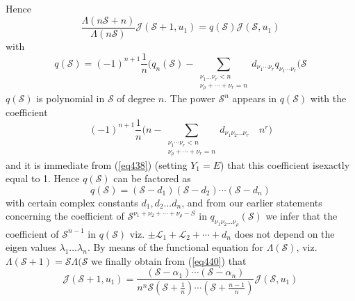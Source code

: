 Hence
\begin{equation*}
\frac{\Lambda (n\mathscr{S}+ n)}{\Lambda (n\mathscr{S})}
\mathcal{J}(\mathscr{S}+1,u_1) = q(\mathscr{S})
\mathcal{J}(\mathscr{S},u_1) \tag{440}\label{eq440} 
\end{equation*}
with 
\begin{equation*}
q(\mathscr{S}) = (-1)^{n+1} \frac{1}{n}(q_n(\mathscr{S}) -
\sum_{\substack{\nu_1 \ldots \nu_r < n \\ \nu_\rho + \cdots + \nu_r =
    n}} d_{\nu_1 \cdots \nu_r} q_{\nu_1 \cdots \nu_r} (\mathscr{S}
\tag{441}\label{eq441} 
\end{equation*}
$q(\mathscr{S})$ is polynomial in $\mathscr{S}$ of degree $n$. The
power $\mathscr{S}^n$ appears in $q(\mathscr{S})$ with the coefficient 
$$
(-1)^{n+1}\frac{1}{n}\big( n - \sum_{\substack{\nu_1 \cdots \nu_r < n
    \\ \nu_\rho + \cdots + \nu_r = n}} d_{\nu_1\nu_2 \ldots \nu_r}
\quad n^r \big) 
$$
and it is immediate from (\ref{eq438}) (setting $Y_1 = E$) that this
coefficient is\pageoriginale exactly equal to 1. Hence
$q(\mathscr{S})$ can be factored as   
\begin{equation*}
q(\mathscr{S}) = (\mathscr{S}-d_1)(\mathscr{S}-d_2) \cdots
(\mathscr{S}-d_n) \tag{442}\label{eq442} 
\end{equation*}
with certain complex constants $d_1,d_2 \ldots d_n$, and from our
earlier statements concerning the coefficient of $\mathscr{S}^{\nu_1+
  \nu_2 + \cdots + \nu_\rho - S}$ in $q_{\nu_1\nu_2 \ldots
  \nu_\rho}(\mathscr{S})$ we infer that the coefficient of
$\mathscr{S}^{n-1}$ in $q(\mathscr{S})$ viz. $\pm \mathscr{L}_1 +
\mathscr{L}_2 + \cdots + d_n$ does not depend on the eigen values
$\lambda_1 \ldots \lambda_n$. By means of the functional equation for
$\Lambda (\mathscr{S})$, viz. $\Lambda (\mathscr{S}+1) =
\mathscr{S}\Lambda(\mathscr{S}$ we finally obtain from (\ref{eq440}) that  
\begin{equation*}
\mathcal{J}(\mathscr{S}+ 1, u_1) = \frac{(\mathscr{S}-\alpha_1)
  \cdots (\mathscr{S}-\alpha_n )}{n^n \mathscr{S}(\mathscr{S} +
  \frac{1}{n} )\cdots (\mathscr{S}+ \frac{n-1}{n})}
\mathcal{J}(\mathscr{S},u_1) \tag{443}\label{eq443} 
\end{equation*}


